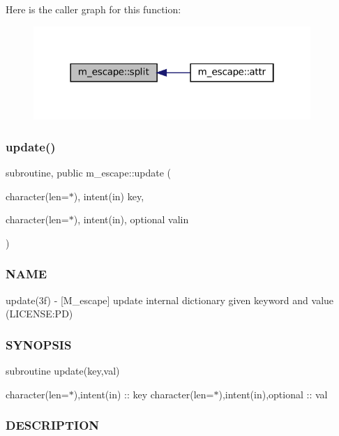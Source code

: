 Here is the caller graph for this function\+:\nopagebreak
\begin{figure}[H]
\begin{center}
\leavevmode
\includegraphics[width=298pt]{namespacem__escape_af23bd97702864e0f32258e6ec0d51506_icgraph}
\end{center}
\end{figure}
\mbox{\label{namespacem__escape_a5efd612f60d281003917329484a7960c}} 
\subsubsection{\texorpdfstring{update()}{update()}}
{\footnotesize\ttfamily subroutine, public m\+\_\+escape\+::update (\begin{DoxyParamCaption}\item[{character(len=$\ast$), intent(in)}]{key,  }\item[{character(len=$\ast$), intent(in), optional}]{valin }\end{DoxyParamCaption})}



\subsubsection*{N\+A\+ME}

update(3f) -\/ \mbox{[}M\+\_\+escape\mbox{]} update internal dictionary given keyword and value (L\+I\+C\+E\+N\+SE\+:PD) \subsubsection*{S\+Y\+N\+O\+P\+S\+IS}

subroutine update(key,val)

character(len=$\ast$),intent(in) \+:\+: key character(len=$\ast$),intent(in),optional \+:\+: val \subsubsection*{D\+E\+S\+C\+R\+I\+P\+T\+I\+ON}

